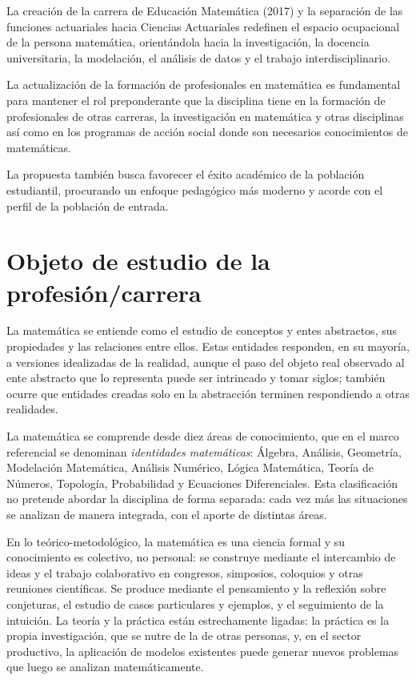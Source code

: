 \documentclass[11pt,a4paper]{article}
\begin{document}
La creación de la carrera de Educación Matemática (2017) y la separación de las funciones actuariales hacia Ciencias Actuariales redefinen el espacio ocupacional de la persona matemática, orientándola hacia la investigación, la docencia universitaria, la modelación, el análisis de datos y el trabajo interdisciplinario.

La actualización de la formación de profesionales en matemática es fundamental para mantener el rol preponderante que la disciplina tiene en la formación de profesionales de otras carreras, la investigación en matemática y otras disciplinas así como en los programas de acción social donde son necesarios conocimientos de matemáticas.

La propuesta también busca favorecer el éxito académico de la población estudiantil, procurando un enfoque pedagógico más moderno y acorde con el perfil de la población de entrada. 



\section{Objeto de estudio de la profesión/carrera}

La matemática se entiende como el estudio de conceptos y entes abstractos, sus propiedades y las relaciones entre ellos. Estas entidades responden, en su mayoría, a versiones idealizadas de la realidad, aunque el paso del objeto real observado al ente abstracto que lo representa puede ser intrincado y tomar siglos; también ocurre que entidades creadas solo en la abstracción terminen respondiendo a otras realidades. 

La matemática se comprende desde diez áreas de conocimiento, que en el marco referencial se denominan \emph{identidades matemáticas}: Álgebra, Análisis, Geometría, Modelación Matemática, Análisis Numérico, Lógica Matemática, Teoría de Números, Topología, Probabilidad y Ecuaciones Diferenciales. Esta clasificación no pretende abordar la disciplina de forma separada: cada vez más las situaciones se analizan de manera integrada, con el aporte de distintas áreas.

En lo teórico-metodológico, la matemática es una ciencia formal y su conocimiento es colectivo, no personal: se construye mediante el intercambio de ideas y el trabajo colaborativo en congresos, simposios, coloquios y otras reuniones científicas. Se produce mediante el pensamiento y la reflexión sobre conjeturas, el estudio de casos particulares y ejemplos, y el seguimiento de la intuición. La teoría y la práctica están estrechamente ligadas: la práctica es la propia investigación, que se nutre de la de otras personas, y, en el sector productivo, la aplicación de modelos existentes puede generar nuevos problemas que luego se analizan matemáticamente. 
\end{document}
